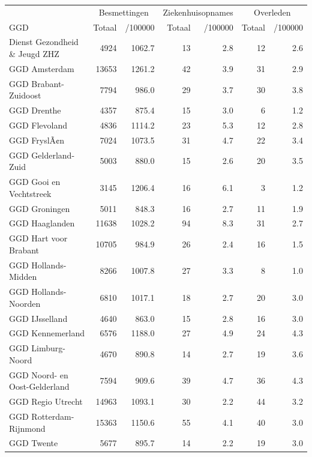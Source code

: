\documentclass[
  english,
  man,floatsintext]{apa6}
\begin{document}
\begin{table}
\centering\begingroup\fontsize{10}{12}\selectfont

\begin{threeparttable}
\begin{tabular}{lrrrrrr}
\toprule
\multicolumn{1}{c}{ } & \multicolumn{2}{c}{Besmettingen} & \multicolumn{2}{c}{Ziekenhuisopnames} & \multicolumn{2}{c}{Overleden} \\
\cmidrule(l{3pt}r{3pt}){2-3} \cmidrule(l{3pt}r{3pt}){4-5} \cmidrule(l{3pt}r{3pt}){6-7}
GGD & Totaal & /100000 & Totaal & /100000 & Totaal & /100000\\
\midrule
Dienst Gezondheid \& Jeugd ZHZ & 4924 & 1062.7 & 13 & 2.8 & 12 & 2.6\\
GGD Amsterdam & 13653 & 1261.2 & 42 & 3.9 & 31 & 2.9\\
GGD Brabant-Zuidoost & 7794 & 986.0 & 29 & 3.7 & 30 & 3.8\\
GGD Drenthe & 4357 & 875.4 & 15 & 3.0 & 6 & 1.2\\
GGD Flevoland & 4836 & 1114.2 & 23 & 5.3 & 12 & 2.8\\
GGD FryslÃ¢n & 7024 & 1073.5 & 31 & 4.7 & 22 & 3.4\\
GGD Gelderland-Zuid & 5003 & 880.0 & 15 & 2.6 & 20 & 3.5\\
GGD Gooi en Vechtstreek & 3145 & 1206.4 & 16 & 6.1 & 3 & 1.2\\
GGD Groningen & 5011 & 848.3 & 16 & 2.7 & 11 & 1.9\\
GGD Haaglanden & 11638 & 1028.2 & 94 & 8.3 & 31 & 2.7\\
GGD Hart voor Brabant & 10705 & 984.9 & 26 & 2.4 & 16 & 1.5\\
GGD Hollands-Midden & 8266 & 1007.8 & 27 & 3.3 & 8 & 1.0\\
GGD Hollands-Noorden & 6810 & 1017.1 & 18 & 2.7 & 20 & 3.0\\
GGD IJsselland & 4640 & 863.0 & 15 & 2.8 & 16 & 3.0\\
GGD Kennemerland & 6576 & 1188.0 & 27 & 4.9 & 24 & 4.3\\
GGD Limburg-Noord & 4670 & 890.8 & 14 & 2.7 & 19 & 3.6\\
GGD Noord- en Oost-Gelderland & 7594 & 909.6 & 39 & 4.7 & 36 & 4.3\\
GGD Regio Utrecht & 14963 & 1093.1 & 30 & 2.2 & 44 & 3.2\\
GGD Rotterdam-Rijnmond & 15363 & 1150.6 & 55 & 4.1 & 40 & 3.0\\
GGD Twente & 5677 & 895.7 & 14 & 2.2 & 19 & 3.0\\

\end{tabular}
\end{threeparttable}
\end{table}
\end{document}
